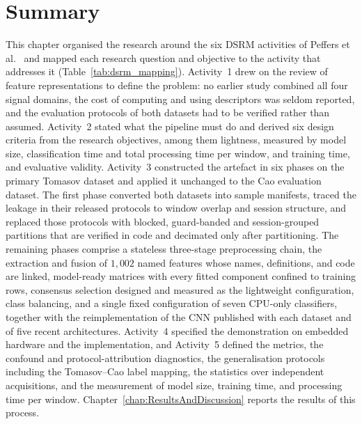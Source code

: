 \section{Summary}
\label{sec:chap3Summary}
This chapter organised the research around the six DSRM activities of Peffers et al.~\cite{peffers2007dsrm} and mapped each research question and objective to the activity that addresses it (Table~\ref{tab:dsrm_mapping}). Activity~1 drew on the review of feature representations to define the problem: no earlier study combined all four signal domains, the cost of computing and using descriptors was seldom reported, and the evaluation protocols of both datasets had to be verified rather than assumed. Activity~2 stated what the pipeline must do and derived six design criteria from the research objectives, among them lightness, measured by model size, classification time and total processing time per window, and training time, and evaluative validity. Activity~3 constructed the artefact in six phases on the primary Tomasov dataset and applied it unchanged to the Cao evaluation dataset. The first phase converted both datasets into sample manifests, traced the leakage in their released protocols to window overlap and session structure, and replaced those protocols with blocked, guard-banded and session-grouped partitions that are verified in code and decimated only after partitioning. The remaining phases comprise a stateless three-stage preprocessing chain, the extraction and fusion of $1{,}002$ named features whose names, definitions, and code are linked, model-ready matrices with every fitted component confined to training rows, consensus selection designed and measured as the lightweight configuration, class balancing, and a single fixed configuration of seven CPU-only classifiers, together with the reimplementation of the CNN published with each dataset and of five recent architectures. Activity~4 specified the demonstration on embedded hardware and the implementation, and Activity~5 defined the metrics, the confound and protocol-attribution diagnostics, the generalisation protocols including the Tomasov--Cao label mapping, the statistics over independent acquisitions, and the measurement of model size, training time, and processing time per window. Chapter~\ref{chap:ResultsAndDiscussion} reports the results of this process.
